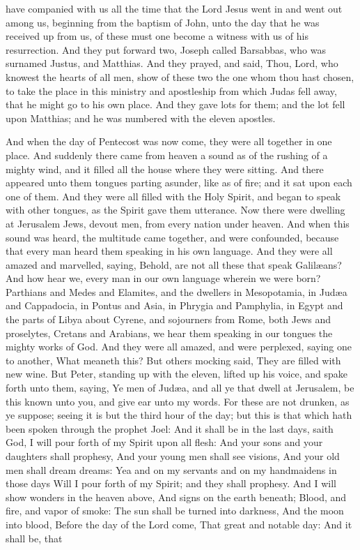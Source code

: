 have companied with us all the time that the Lord Jesus went in and went out among us, beginning from the baptism of John, unto the day that he was received up from us, of these must one become a witness with us of his resurrection. And they put forward two, Joseph called Barsabbas, who was surnamed Justus, and Matthias. And they prayed, and said, Thou, Lord, who knowest the hearts of all men, show of these two the one whom thou hast chosen, to take the place in this ministry and apostleship from which Judas fell away, that he might go to his own place. And they gave lots for them; and the lot fell upon Matthias; and he was numbered with the eleven apostles. 

And when the day of Pentecost was now come, they were all together in one place. And suddenly there came from heaven a sound as of the rushing of a mighty wind, and it filled all the house where they were sitting. And there appeared unto them tongues parting asunder, like as of fire; and it sat upon each one of them. And they were all filled with the Holy Spirit, and began to speak with other tongues, as the Spirit gave them utterance.  Now there were dwelling at Jerusalem Jews, devout men, from every nation under heaven. And when this sound was heard, the multitude came together, and were confounded, because that every man heard them speaking in his own language. And they were all amazed and marvelled, saying, Behold, are not all these that speak Galilæans? And how hear we, every man in our own language wherein we were born? Parthians and Medes and Elamites, and the dwellers in Mesopotamia, in Judæa and Cappadocia, in Pontus and Asia, in Phrygia and Pamphylia, in Egypt and the parts of Libya about Cyrene, and sojourners from Rome, both Jews and proselytes, Cretans and Arabians, we hear them speaking in our tongues the mighty works of God. And they were all amazed, and were perplexed, saying one to another, What meaneth this? But others mocking said, They are filled with new wine.  But Peter, standing up with the eleven, lifted up his voice, and spake forth unto them, saying, Ye men of Judæa, and all ye that dwell at Jerusalem, be this known unto you, and give ear unto my words. For these are not drunken, as ye suppose; seeing it is but the third hour of the day; but this is that which hath been spoken through the prophet Joel:  And it shall be in the last days, saith God, I will pour forth of my Spirit upon all flesh: And your sons and your daughters shall prophesy, And your young men shall see visions, And your old men shall dream dreams:  Yea and on my servants and on my handmaidens in those days Will I pour forth of my Spirit; and they shall prophesy.  And I will show wonders in the heaven above, And signs on the earth beneath; Blood, and fire, and vapor of smoke:  The sun shall be turned into darkness, And the moon into blood, Before the day of the Lord come, That great and notable day:  And it shall be, that 